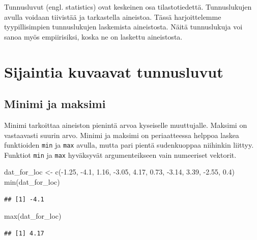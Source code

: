 \documentclass[
]{book}
\newenvironment{Shaded}{\begin{snugshade}}{\end{snugshade}}
\newcommand{\FloatTok}[1]{\textcolor[rgb]{0.00,0.00,0.81}{#1}}
\newcommand{\FunctionTok}[1]{\textcolor[rgb]{0.00,0.00,0.00}{#1}}
\newcommand{\NormalTok}[1]{#1}
\newcommand{\OtherTok}[1]{\textcolor[rgb]{0.56,0.35,0.01}{#1}}
\newcommand{\SpecialCharTok}[1]{\textcolor[rgb]{0.00,0.00,0.00}{#1}}
\begin{document}
Tunnusluvut (engl. statistics) ovat keskeinen osa tilastotiedettä. Tunnuslukujen avulla voidaan tiivistää ja tarkastella aineistoa. Tässä harjoittelemme tyypillisimpien tunnuslukujen laskemista aineistosta. Näitä tunnuslukuja voi sanoa myös empiirisiksi, koska ne on laskettu aineistosta.

\hypertarget{sijaintia-kuvaavat-tunnusluvut}{%
\section{Sijaintia kuvaavat tunnusluvut}\label{sijaintia-kuvaavat-tunnusluvut}}

\hypertarget{minimi-ja-maksimi}{%
\subsection{Minimi ja maksimi}\label{minimi-ja-maksimi}}

Minimi tarkoittaa aineiston pienintä arvoa kyseiselle muuttujalle. Maksimi on vastaavasti suurin arvo. Minimi ja maksimi on periaatteessa helppoa laskea funktioiden \texttt{min} ja \texttt{max} avulla, mutta pari pientä sudenkuoppaa niihinkin liittyy. Funktiot \texttt{min} ja \texttt{max} hyväksyvät argumenteikseen vain numeeriset vektorit.

\begin{Shaded}
\begin{Highlighting}[]
\NormalTok{dat\_for\_loc }\OtherTok{\textless{}{-}} \FunctionTok{c}\NormalTok{(}\SpecialCharTok{{-}}\FloatTok{1.25}\NormalTok{, }\SpecialCharTok{{-}}\FloatTok{4.1}\NormalTok{, }\FloatTok{1.16}\NormalTok{, }\SpecialCharTok{{-}}\FloatTok{3.05}\NormalTok{, }\FloatTok{4.17}\NormalTok{, }\FloatTok{0.73}\NormalTok{, }\SpecialCharTok{{-}}\FloatTok{3.14}\NormalTok{, }\FloatTok{3.39}\NormalTok{, }\SpecialCharTok{{-}}\FloatTok{2.55}\NormalTok{, }\FloatTok{0.4}\NormalTok{)}
\FunctionTok{min}\NormalTok{(dat\_for\_loc)}
\end{Highlighting}
\end{Shaded}

\begin{verbatim}
## [1] -4.1
\end{verbatim}

\begin{Shaded}
\begin{Highlighting}[]
\FunctionTok{max}\NormalTok{(dat\_for\_loc)}
\end{Highlighting}
\end{Shaded}

\begin{verbatim}
## [1] 4.17
\end{verbatim}
\end{document}
